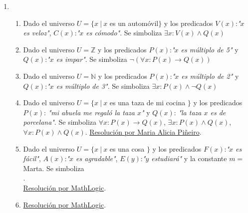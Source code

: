 \documentclass[a4paper]{article}
\newcommand{\exercise}{\item}
\newcommand{\then}{\to}
\begin{document}
\begin{enumerate}
\begin{enumerate} [label=(\alph*)]
		\item Razonamiento inválido. Se puede refutar mediante: \\  \\ También se puede buscar un contraejemplo: $k=3$ y $x^2+3.x+1$ tiene las raíces reales $x_1=\frac{-3-\sqrt{5}}{2}$ y $x_2=\frac{-3+\sqrt{5}}{2}$.
		\item Razonamiento válido. \\ 
\end{enumerate}\exercise\begin{enumerate} [label=(\alph*)]		\item Dado el universo $U = \{x ~|~ x$ es un automóvil$\}$ y los predicados $V(x)$:\textit{"$x$ es veloz"}, $C(x)$:\textit{"$x$ es cómodo"}. Se simboliza $\exists x: V(x) \land  Q(x)$
		\item Dado el universo $U = \mathbb{Z}$ y los predicados $P(x)$:\textit{"$x$ es múltiplo de 5"} y $Q(x)$:\textit{"$x$ es impar"}. Se simboliza $\neg \left(\forall x: P(x) \then  Q(x) \right)$
		\item Dado el universo $U = \mathbb{N}$ y los predicados  $P(x)$:\textit{"$x$ es múltiplo de 2"} y $Q(x)$:\textit{"$x$ es múltiplo de 3"}. Se simboliza $\exists x: P(x) \land  \neg Q(x)$
		\item Dado el universo $U = \{x ~|~ x$ es una taza de mi cocina $\}$ y los predicados $P(x)$: \textit{"mi abuela me regaló la taza $x$"} y $Q(x)$: \textit{"la taza $x$ es de porcelana"}. Se simboliza $\forall x: P(x) \then Q(x)$, $\exists x: P(x) \land Q(x)$, $\forall x: P(x) \land Q(x)$. \href{https://youtu.be/aI-G5V-IGfA}{Resolución por Maria Alicia Piñeiro}.
		\item Dado el universo $U = \{x ~|~ x$ es una cosa $\}$ y los predicados $F(x)$:\textit{"$x$ es fácil"}, $A(x)$:\textit{"$x$ es agradable"}, $E(y)$:\textit{"$y$ estudiará"} y la constante $m=$Marta. Se simboliza \\  \Reasoning{$\left(\forall x: F(x) \land A(x) \right) \then \neg E(m)$;$\neg \left( \exists x: \neg A(x) \right)$;$\forall x: F(x)$}{$\neg E(m)$}. \\\href{https://youtu.be/M71MEB3TkVw?t=736}{Resolución por MathLogic}.
		\item \href{https://youtu.be/M71MEB3TkVw?t=1191}{Resolución por MathLogic}.

\end{enumerate}
\end{enumerate}
\end{document}
